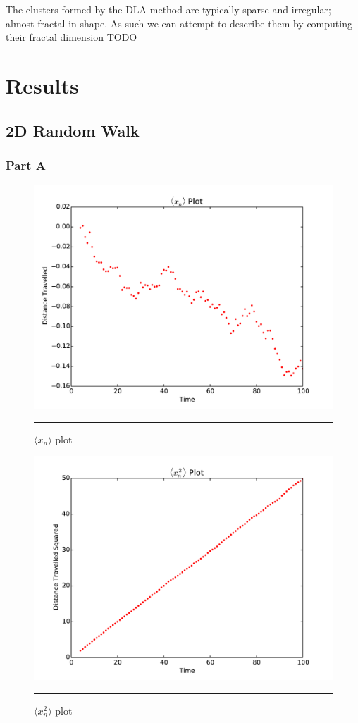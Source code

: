 \documentclass[notitlepage,aps,prd,nofootinbib]{revtex4-1}
\begin{document}
The clusters formed by the DLA method are typically sparse and irregular; almost fractal in shape. As such we can attempt to describe them by computing their fractal dimension
TODO

\clearpage
\section{Results}
\label{sec:results}
\subsection{2D Random Walk}
\subsubsection{Part A}
\begin{figure}[!htbc]
  \centering
  \includegraphics[width=.6\textwidth]{../output/plots_for_paper/problem_1/xn_plot.pdf}
  	{\par\nobreak\rule[9pt]{35em}{0.5pt}\vspace{-5mm}}
	\caption{$\langle x_{n} \rangle$ plot}
	\label{fig:1_a_1}
  \includegraphics[width=.6\textwidth]{../output/plots_for_paper/problem_1/xn2_plot.pdf}
  	{\par\nobreak\rule[9pt]{35em}{0.5pt}\vspace{-5mm}}
	\caption{$\langle x_{n}^{2} \rangle$ plot}
	\label{fig:1_a_2}
\end{figure}
\end{document}
